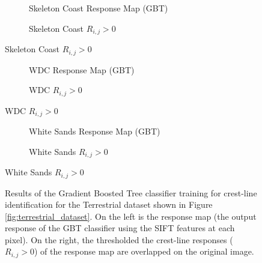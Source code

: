 \begin{figure}[H]
	\ContinuedFloat
	\centering
	\begin{subfigure}{0.48\textwidth}
		\centering
		\caption{Skeleton Coast Response Map (GBT)}
		\label{fig:SkeletonCoast_gbt_response}
	\end{subfigure}
	\begin{subfigure}{0.48\textwidth}
		\centering
		\caption{ Skeleton Coast $R_{i,j} > 0$}
		\label{fig:SkeletonCoast_gbt_response_overlay}
	\end{subfigure}
\end{figure}
\begin{figure}[H]
	\ContinuedFloat
	\centering
	\begin{subfigure}{0.48\textwidth}
		\centering
		\caption{WDC Response Map (GBT)}
		\label{fig:WDC_gbt_response}
	\end{subfigure}
	\begin{subfigure}{0.48\textwidth}
		\centering
		\caption{ WDC $R_{i,j} > 0$}
		\label{fig:WDC_gbt_response_overlay}
	\end{subfigure}
\end{figure}
\begin{figure}[H]
	\ContinuedFloat
	\centering
	\begin{subfigure}{0.48\textwidth}
		\centering
		\caption{White Sands Response Map (GBT)}
		\label{fig:WhiteSands_gbt_response}
	\end{subfigure}
	\begin{subfigure}{0.48\textwidth}
		\centering
		\caption{ White Sands $R_{i,j} > 0$}
		\label{fig:WhiteSands_gbt_response_overlay}
	\end{subfigure}
\end{figure}
\begin{figure}[H]
	\ContinuedFloat
	\centering
	\caption{Results of the Gradient Boosted Tree classifier training for crest-line identification for the Terrestrial dataset shown in Figure \ref{fig:terrestrial_dataset}. On the left is the response map (the output response of the GBT classifier using the SIFT features at each pixel). On the right, the thresholded the crest-line responses ($R_{i,j} > 0$) of the response map are overlapped on the original image. }
	\label{fig:gbt_response_results}
\end{figure}

